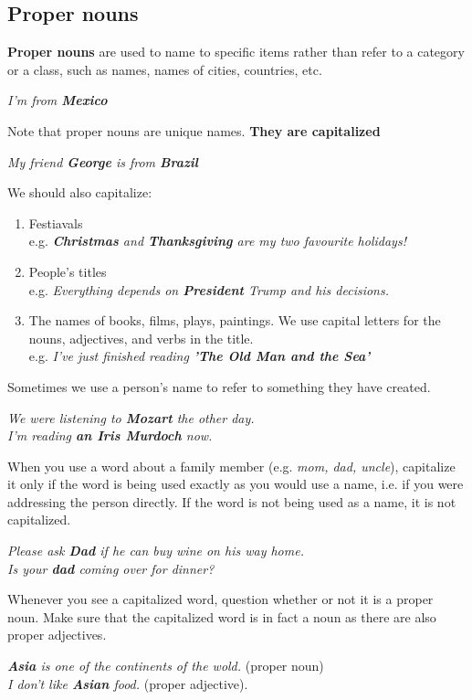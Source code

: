 \documentclass[hidelinks,10pt,a4paper]{article}
\begin{document}
\subsection{Proper nouns}
\textbf{Proper nouns} are used to name to specific items rather than refer to a category or a class, such as names, names of cities, countries, etc.
\begin{center}
		\textit{I'm from \textbf{Mexico} }
\end{center}
Note that proper nouns are unique names. \textbf{They are capitalized}
\begin{center}
	\textit{My friend \textbf{George} is from \textbf{Brazil}  }
\end{center}
We should also capitalize:
\begin{enumerate}[label=\alph*)]
		\item Festiavals\\
				e.g. \textit{\textbf{Christmas} and \textbf{Thanksgiving} are my two favourite holidays!}
		\item People's titles\\
				e.g. \textit{Everything depends on \textbf{President} Trump and his decisions.}
		\item The names of books, films, plays, paintings. We use capital letters for the nouns, adjectives, and verbs in the title.\\
				e.g. \textit{I've just finished reading \textbf{'The Old Man and the Sea'}}
\end{enumerate}
Sometimes we use a person's name to refer to something they have created.
\begin{center}
\textit{We were listening to \textbf{Mozart} the other day.}\\
\textit{I'm reading \textbf{an Iris Murdoch} now.}
\end{center}

When you use a word about a family member (e.g. \textit{mom, dad, uncle}), capitalize it only if the word is being used exactly as you would use a name, i.e. if you were addressing the person directly. If the word is not being used as a name, it is not capitalized.
\begin{center}
		\textit{Please ask \textbf{Dad} if he can buy wine on his way home.}\\
		\textit{Is your \textbf{dad} coming over for dinner?}
\end{center}
Whenever you see a capitalized word, question whether or not it is a proper noun. Make sure that the capitalized word is in fact a noun as there are also proper adjectives.
\begin{center}
		\textit{ \textbf{Asia} is one of the continents of the wold.} (proper noun)\\
		\textit{I don't like \textbf{Asian} food.} (proper adjective).
\end{center}
\end{document}
